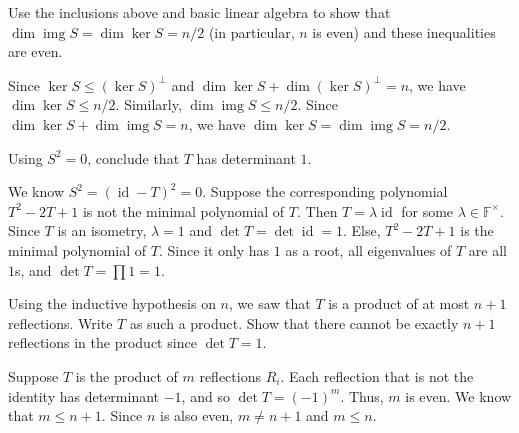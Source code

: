 \documentclass[12 pt, letterpaper]{hmcpset}
\begin{document}
\pagebreak

\begin{problem}[(5)]
	Use the inclusions above and basic linear algebra to show that $\dim \operatorname{img} S = \dim \ker S = n / 2$ (in particular, $n$ is even) and these inequalities are even.
\end{problem}

\begin{solution}
	Since $\ker S \le (\ker S)^{\perp}$ and $\dim \ker S + \dim (\ker S)^{\perp} = n$, we have $\dim \ker S \le n / 2$. Similarly, $\dim \operatorname{img} S \le n / 2$. Since $\dim \ker S + \dim \operatorname{img} S = n$, we have $\dim \ker S = \dim \operatorname{img} S = n / 2$.
\end{solution}

\pagebreak

\begin{problem}[(6)]
	Using $S^{2} = 0$, conclude that $T$ has determinant $1$.
\end{problem}

\begin{solution}
	We know $S^{2} = (\operatorname{id} - T)^{2} = 0$. Suppose the corresponding polynomial $T^{2} - 2 T + 1$ is not the minimal polynomial of $T$. Then $T = \lambda \operatorname{id}$ for some $\lambda \in \mathbb{F}^{\times}$. Since $T$ is an isometry, $\lambda = 1$ and $\det T = \det \operatorname{id} = 1$. Else, $T^{2} - 2T + 1$ is the minimal polynomial of $T$. Since it only has $1$ as a root, all eigenvalues of $T$ are all $1$s, and $\det T = \prod 1 = 1$.
\end{solution}

\pagebreak

\begin{problem}[(7)]
	Using the inductive hypothesis on $n$, we saw that $T$ is a product of at most $n + 1$ reflections. Write $T$ as such a product. Show that there cannot be exactly $n + 1$ reflections in the product since $\det T = 1$.
\end{problem}

\begin{solution}
	Suppose $T$ is the product of $m$ reflections $R_{i}$. Each reflection that is not the identity has determinant $-1$, and so $\det T = (-1)^{m}$. Thus, $m$ is even. We know that $m \le n + 1$. Since $n$ is also even, $m \neq n + 1$ and $m \le n$.
\end{solution}
\end{document}
